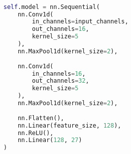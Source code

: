\begin{lstlisting}[language=Python, caption={CNN architecture}]

self.model = nn.Sequential(
	nn.Conv1d(
		in_channels=input_channels,
		out_channels=16,
		kernel_size=5
	),
	nn.MaxPool1d(kernel_size=2),
	
	nn.Conv1d(
		in_channels=16,
		out_channels=32,
		kernel_size=5
	),
	nn.MaxPool1d(kernel_size=2),
	
	nn.Flatten(),
	nn.Linear(feature_size, 128),
	nn.ReLU(),
	nn.Linear(128, 27)
)
\end{lstlisting}